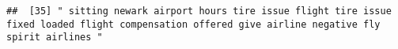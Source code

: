 \documentclass[
]{article}
\begin{document}
\begin{verbatim}
##  [35] " sitting newark airport hours tire issue flight tire issue fixed loaded flight compensation offered give airline negative fly spirit airlines "                                                                                                                                                                                                                                                                                                                                                                                                                                                                                                                                                                                                                                                                                                                                                                                                                                                                                                                                                                                                                                                                                                                                                                                                                                                                                                                                                                                                                                                                                                                                                                                                                                                

\end{verbatim}
\end{document}

